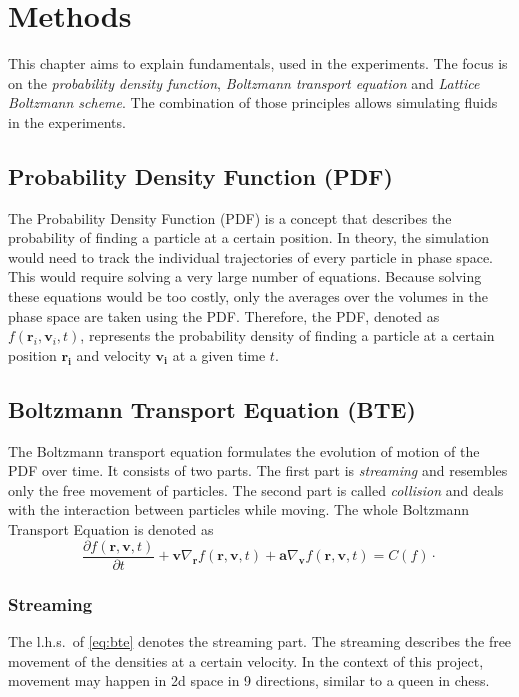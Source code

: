 \chapter{Methods}\label{ch:methods}
This chapter aims to explain fundamentals, used in the experiments.
The focus is on the \textit{probability density function}, \textit{Boltzmann transport equation} and \textit{Lattice Boltzmann scheme}.
The combination of those principles allows simulating fluids in the experiments.


\section{Probability Density Function (PDF)}\label{sec:probability-density-function-(pdf)}
The Probability Density Function (PDF) is a concept that describes the probability of finding a particle at a certain position.
In theory, the simulation would need to track the individual trajectories of every particle in phase space.
This would require solving a very large number of equations.
Because solving these equations would be too costly, only the averages over the volumes in the phase space are taken using the PDF\@.
Therefore, the PDF, denoted as \(f(\mathbf r_i,\mathbf v_i,t)\), represents the probability density of finding a particle at a certain position \(\mathbf{r_i}\) and velocity \(\mathbf{v_i}\) at a given time \(t\).


\section{Boltzmann Transport Equation (BTE)}
The Boltzmann transport equation formulates the evolution of motion of the PDF over time.
It consists of two parts.
The first part is \textit{streaming} and resembles only the free movement of particles.
The second part is called \textit{collision} and deals with the interaction between particles while moving.
The whole Boltzmann Transport Equation is denoted as
\begin{equation}
    \frac{\partial f\left(\mathbf{r},\mathbf{v},t\right)}{\partial t}+\mathbf{v}\nabla_{\mathbf{r}} f\left(\mathbf{r},\mathbf{v},t\right)
    +\mathbf{a}\nabla_{\mathbf{v}} f\left(\mathbf{r},\mathbf{v},t\right)=C(f)
    \cdot
    \label{eq:bte}
\end{equation}

\subsection{Streaming}\label{subsec:streaming}
The l.h.s.\ of \cref{eq:bte} denotes the streaming part.
The streaming describes the free movement of the densities at a certain velocity.
In the context of this project, movement may happen in 2d space in 9 directions, similar to a queen in chess.

